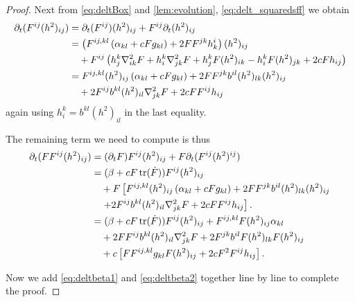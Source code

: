 \documentclass{amsart}
\begin{document}
\begin{proof}
Next from \cref{eq:deltBox} and \cref{lem:evolution}, \cref{eq:delt_squaredsff} we obtain
\[
\begin{split}
\partial_{t} (F^{ij}(h^2)_{ij}) &= \partial_{t}(F^{ij}) (h^2)_{ij} + F^{ij} \partial_t (h^2)_{ij} \\
&= \left(F^{ij,kl} \left(\alpha_{kl} + c F g_{kl}\right) + 2FF^{jk}h^{i}_{k}\right) (h^2)_{ij} \\
&\quad + F^{ij} \left(h^k_j \nabla^2_{i
k} F + h^k_i \nabla^2_{jk} F + h^k_j F(h^2)_{ik} - h^k_i F(h^2)_{jk} + 2cF h_{ij}\right) \\
&= F^{ij,kl} (h^2)_{ij} \left(\alpha_{kl} + c F g_{kl}\right) + 2FF^{jk} b^{il} (h^2)_{lk} (h^2)_{ij} \\
&\quad + 2 F^{ij} b^{kl} (h^2)_{il} \nabla^2_{jk} F  + 2cFF^{ij}h_{ij}
\end{split}
\]
again using \(h^k_i = b^{kl} (h^2)_{il}\) in the last equality.

The remaining term we need to compute is thus
\begin{equation}
\label{eq:deltbeta2}
\begin{split}
\partial_{t} (F F^{ij}(h^2)_{ij}) &= (\partial_{t} F) F^{ij}(h^2)_{ij} + F \partial_t (F^{ij} (h^2)^{ij}) \\
&= (\beta + c F\operatorname{tr}(\dot{F})) F^{ij}(h^2)_{ij} \\
&\quad + F \left[F^{ij,kl} (h^2)_{ij} \left(\alpha_{kl} + c F g_{kl}\right) + 2FF^{jk} b^{il} (h^2)_{lk} (h^2)_{ij} \right.\\
&\quad \left. + 2 F^{ij} b^{kl} (h^2)_{il} \nabla^2_{jk} F  + 2cFF^{ij}h_{ij}\right]. \\
&= (\beta + c F\operatorname{tr}(\dot{F})) F^{ij}(h^2)_{ij} + F^{ij,kl} F (h^2)_{ij} \alpha_{kl}  \\
&\quad + 2 FF^{ij} b^{kl} (h^2)_{il} \nabla^2_{jk} F + 2F^{jk} b^{il} F (h^2)_{lk} F (h^2)_{ij} \\
&\quad + c \left[F F^{ij,kl} g_{kl} F (h^2)_{ij} + 2cF^2F^{ij}h_{ij}\right].
\end{split}
\end{equation}

Now we add \cref{eq:deltbeta1} and \cref{eq:deltbeta2} together line by line to complete the proof.
\end{proof}
\end{document}
